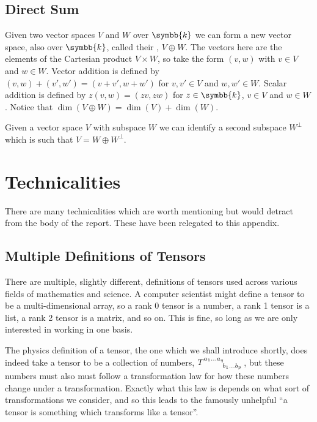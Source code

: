 \documentclass[fleqn]{NotesClass}
\renewcommand{\field}{\symbb{k}}
\begin{document}
\begin{appendices}
        \section{Direct Sum}
        Given two vector spaces \(V\) and \(W\) over \(\field\) we can form a new vector space, also over \(\field\), called their , \(V \oplus W\).
        The vectors here are the elements of the Cartesian product \(V \times W\), so take the form \((v, w)\) with \(v \in V\) and \(w \in W\).
        Vector addition is defined by \((v, w) + (v', w') = (v + v', w + w')\) for \(v, v' \in V\) and \(w, w' \in W\).
        Scalar addition is defined by \(z(v, w) = (zv, zw)\) for \(z \in \field\), \(v \in V\) and \(w \in W\).
        Notice that \(\dim(V \oplus W) = \dim(V) + \dim(W)\).
        
        Given a vector space \(V\) with subspace \(W\) we can identify a second subspace \(W^{\perp}\) which is such that \(V = W \oplus W^{\perp}\).
        
        
        \chapter{Technicalities}
        There are many technicalities which are worth mentioning but would detract from the body of the report.
        These have been relegated to this appendix.
        
        \section{Multiple Definitions of Tensors}\label{sec:technicalities tensor defs}
        There are multiple, slightly different, definitions of tensors used across various fields of mathematics and science.
        A computer scientist might define a tensor to be a multi-dimensional array, so a rank 0 tensor is a number, a rank 1 tensor is a list, a rank 2 tensor is a matrix, and so on.
        This is fine, so long as we are only interested in working in one basis.
        
        The physics definition of a tensor, the one which we shall introduce shortly, does indeed take a tensor to be a collection of numbers, \(\tensor{T}{^{a_1\dotso a_q}_{b_1\dotso b_p}}\), but these numbers must also must follow a transformation law for how these numbers change under a transformation.
        Exactly what this law is depends on what sort of transformations we consider, and so this leads to the famously unhelpful \enquote{a tensor is something which transforms like a tensor}.
        

\end{appendices}
\end{document}
